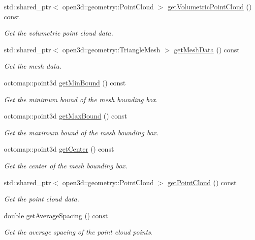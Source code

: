 \begin{DoxyCompactItemize}
std\+::shared\+\_\+ptr$<$ open3d\+::geometry\+::\+Point\+Cloud $>$ \hyperlink{classvisioncraft_1_1ModelLoader_a1f1dddeb3ef0d1ba500010b85098c2d0}{get\+Volumetric\+Point\+Cloud} () const
\begin{DoxyCompactList}\small\item\em Get the volumetric point cloud data. \end{DoxyCompactList}\item 
std\+::shared\+\_\+ptr$<$ open3d\+::geometry\+::\+Triangle\+Mesh $>$ \hyperlink{classvisioncraft_1_1ModelLoader_a2aff2187dd584802b75e3e2f06a6556c}{get\+Mesh\+Data} () const
\begin{DoxyCompactList}\small\item\em Get the mesh data. \end{DoxyCompactList}\item 
octomap\+::point3d \hyperlink{classvisioncraft_1_1ModelLoader_a3edc3582762a0d32e4d47264db00f65a}{get\+Min\+Bound} () const
\begin{DoxyCompactList}\small\item\em Get the minimum bound of the mesh bounding box. \end{DoxyCompactList}\item 
octomap\+::point3d \hyperlink{classvisioncraft_1_1ModelLoader_a9b0654b6b9064477d4b8536368faddbd}{get\+Max\+Bound} () const
\begin{DoxyCompactList}\small\item\em Get the maximum bound of the mesh bounding box. \end{DoxyCompactList}\item 
octomap\+::point3d \hyperlink{classvisioncraft_1_1ModelLoader_a8c495bcdad1fa88a7467299de897556a}{get\+Center} () const
\begin{DoxyCompactList}\small\item\em Get the center of the mesh bounding box. \end{DoxyCompactList}\item 
std\+::shared\+\_\+ptr$<$ open3d\+::geometry\+::\+Point\+Cloud $>$ \hyperlink{classvisioncraft_1_1ModelLoader_a7bbb30715d96a5f0528f1ea020e77fe1}{get\+Point\+Cloud} () const
\begin{DoxyCompactList}\small\item\em Get the point cloud data. \end{DoxyCompactList}\item 
double \hyperlink{classvisioncraft_1_1ModelLoader_ab74391644bf2539d37c072f4bb651254}{get\+Average\+Spacing} () const
\begin{DoxyCompactList}\small\item\em Get the average spacing of the point cloud points. \end{DoxyCompactList}\item 

\end{DoxyCompactItemize}
